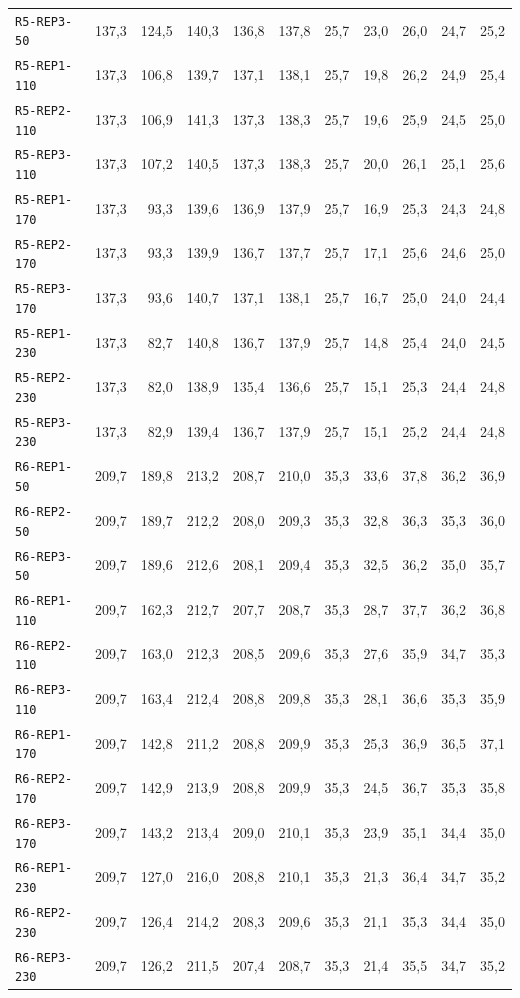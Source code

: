 \begin{footnotesize}
\begin{longtable}{@{}lrrrrrrrrrr@{}}
\texttt{R5-REP3-50} & 137,3 & 124,5 & 140,3 & 136,8 & 137,8 & 25,7 & 23,0 & 26,0 & 24,7 & 25,2 \\
\texttt{R5-REP1-110} & 137,3 & 106,8 & 139,7 & 137,1 & 138,1 & 25,7 & 19,8 & 26,2 & 24,9 & 25,4 \\
\texttt{R5-REP2-110} & 137,3 & 106,9 & 141,3 & 137,3 & 138,3 & 25,7 & 19,6 & 25,9 & 24,5 & 25,0 \\
\texttt{R5-REP3-110} & 137,3 & 107,2 & 140,5 & 137,3 & 138,3 & 25,7 & 20,0 & 26,1 & 25,1 & 25,6 \\
\texttt{R5-REP1-170} & 137,3 & 93,3 & 139,6 & 136,9 & 137,9 & 25,7 & 16,9 & 25,3 & 24,3 & 24,8 \\
\texttt{R5-REP2-170} & 137,3 & 93,3 & 139,9 & 136,7 & 137,7 & 25,7 & 17,1 & 25,6 & 24,6 & 25,0 \\
\texttt{R5-REP3-170} & 137,3 & 93,6 & 140,7 & 137,1 & 138,1 & 25,7 & 16,7 & 25,0 & 24,0 & 24,4 \\
\texttt{R5-REP1-230} & 137,3 & 82,7 & 140,8 & 136,7 & 137,9 & 25,7 & 14,8 & 25,4 & 24,0 & 24,5 \\
\texttt{R5-REP2-230} & 137,3 & 82,0 & 138,9 & 135,4 & 136,6 & 25,7 & 15,1 & 25,3 & 24,4 & 24,8 \\
\texttt{R5-REP3-230} & 137,3 & 82,9 & 139,4 & 136,7 & 137,9 & 25,7 & 15,1 & 25,2 & 24,4 & 24,8 \\
\texttt{R6-REP1-50} & 209,7 & 189,8 & 213,2 & 208,7 & 210,0 & 35,3 & 33,6 & 37,8 & 36,2 & 36,9 \\
\texttt{R6-REP2-50} & 209,7 & 189,7 & 212,2 & 208,0 & 209,3 & 35,3 & 32,8 & 36,3 & 35,3 & 36,0 \\
\texttt{R6-REP3-50} & 209,7 & 189,6 & 212,6 & 208,1 & 209,4 & 35,3 & 32,5 & 36,2 & 35,0 & 35,7 \\
\texttt{R6-REP1-110} & 209,7 & 162,3 & 212,7 & 207,7 & 208,7 & 35,3 & 28,7 & 37,7 & 36,2 & 36,8 \\
\texttt{R6-REP2-110} & 209,7 & 163,0 & 212,3 & 208,5 & 209,6 & 35,3 & 27,6 & 35,9 & 34,7 & 35,3 \\
\texttt{R6-REP3-110} & 209,7 & 163,4 & 212,4 & 208,8 & 209,8 & 35,3 & 28,1 & 36,6 & 35,3 & 35,9 \\
\texttt{R6-REP1-170} & 209,7 & 142,8 & 211,2 & 208,8 & 209,9 & 35,3 & 25,3 & 36,9 & 36,5 & 37,1 \\
\texttt{R6-REP2-170} & 209,7 & 142,9 & 213,9 & 208,8 & 209,9 & 35,3 & 24,5 & 36,7 & 35,3 & 35,8 \\
\texttt{R6-REP3-170} & 209,7 & 143,2 & 213,4 & 209,0 & 210,1 & 35,3 & 23,9 & 35,1 & 34,4 & 35,0 \\
\texttt{R6-REP1-230} & 209,7 & 127,0 & 216,0 & 208,8 & 210,1 & 35,3 & 21,3 & 36,4 & 34,7 & 35,2 \\
\texttt{R6-REP2-230} & 209,7 & 126,4 & 214,2 & 208,3 & 209,6 & 35,3 & 21,1 & 35,3 & 34,4 & 35,0 \\
\texttt{R6-REP3-230} & 209,7 & 126,2 & 211,5 & 207,4 & 208,7 & 35,3 & 21,4 & 35,5 & 34,7 & 35,2 \\
\end{longtable}
\end{footnotesize}
